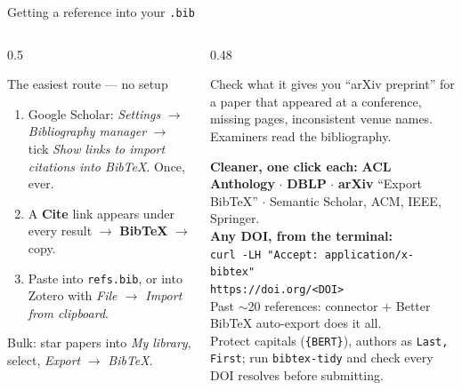 \documentclass[aspectratio=169,11pt]{beamer}
\newcommand{\code}[1]{\texttt{\small #1}}
\newcommand{\key}[1]{\textbf{\color{brand}#1}}
\begin{document}
\begin{frame}{Getting a reference into your \code{.bib}}
\begin{columns}[T]
\begin{column}{0.5\textwidth}
\begin{block}{The easiest route --- no setup}
\footnotesize
\begin{enumerate}
  \item Google Scholar: \emph{Settings} $\rightarrow$ \emph{Bibliography
        manager} $\rightarrow$ tick \emph{Show links to import citations into
        BibTeX}. Once, ever.
  \item A \key{Cite} link appears under every result $\rightarrow$
        \key{BibTeX} $\rightarrow$ copy.
  \item Paste into \code{refs.bib}, or into Zotero with \emph{File
        $\rightarrow$ Import from clipboard}.
\end{enumerate}
Bulk: star papers into \emph{My library}, select, \emph{Export} $\rightarrow$
\emph{BibTeX}.
\end{block}
\end{column}
\begin{column}{0.48\textwidth}
\begin{alertblock}{Check what it gives you}
\footnotesize
``arXiv preprint'' for a paper that appeared at a conference, missing pages,
inconsistent venue names. Examiners read the bibliography.
\end{alertblock}
\footnotesize
\textbf{Cleaner, one click each:} \key{ACL Anthology} $\cdot$ \key{DBLP}
$\cdot$ \key{arXiv} ``Export BibTeX'' $\cdot$ Semantic Scholar, ACM, IEEE,
Springer.\\[3pt]
\textbf{Any DOI, from the terminal:}\\
\code{curl -LH "Accept: application/x-bibtex"}\\
\code{https://doi.org/<DOI>}\\[3pt]
Past $\sim$20 references: connector + Better BibTeX auto-export does it all.\\[3pt]
Protect capitals (\code{\{BERT\}}), authors as \code{Last, First}; run
\code{bibtex-tidy} and check every DOI resolves before submitting.
\end{column}
\end{columns}
\end{frame}
\end{document}
